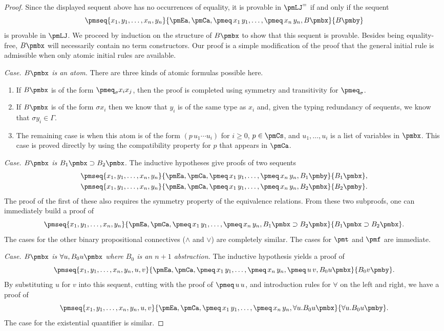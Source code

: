 \begin{proof}
Since the displayed sequent above has no occurrences of equality, it is provable in $\pmLJ^=$ if and only if the sequent
\[\pmseq{x_1,y_1,\ldots,x_n,y_n}{\pmEa,\pmCa,\pmeq\,x_1\,y_1,\ldots,\pmeq\,x_n\,y_n,B\pmbx}{B\pmby}\]
is provable in $\pmLJ$. We proceed by induction on the structure of $B\pmbx$ to show that this sequent is provable. Besides being equality-free, $B\pmbx$ will necessarily contain no term constructors. Our proof is a simple modification of the proof that the general initial rule is admissible when only atomic initial rules are available.\par
\emph{Case. $B\pmbx$ is an atom.} There are three kinds of atomic formulas possible here.
\begin{enumerate}
\item If $B\pmbx$ is of the form $\pmeq_\sigma x_i x_j$, then the proof is completed using symmetry and transitivity for $\pmeq_\sigma$.
\item If $B\pmbx$ is of the form $\sigma x_i$ then we know that $y_i$ is of the same type as $x_i$ and, given the typing redundancy of sequents, we know that $\sigma y_i\in\Gamma$.
\item The remaining case is when this atom is of the form $(p\,u_1\cdots u_i)$ for $i\geq0$, $p\in\pmCs$, and $u_1,\ldots,u_i$ is a list of variables in $\pmbx$. This case is proved directly by using the compatibility property for $p$ that appears in $\pmCa$.
\end{enumerate}
\emph{Case. $B\pmbx$ is $B_1\pmbx\supset B_2\pmbx$.} The inductive hypotheses give proofs of two sequents
\begin{gather*}
\pmseq{x_1,y_1,\ldots,x_n,y_n}{\pmEa,\pmCa,\pmeq\,x_1\,y_1,\ldots,\pmeq\,x_n\,y_n,B_1\pmby}{B_1\pmbx},\\
\pmseq{x_1,y_1,\ldots,x_n,y_n}{\pmEa,\pmCa,\pmeq\,x_1\,y_1,\ldots,\pmeq\,x_n\,y_n,B_2\pmbx}{B_2\pmby}.
\end{gather*}
The proof of the first of these also requires the symmetry property of the equivalence relations. From these two subproofs, one can immediately build a proof of
\[\pmseq{x_1,y_1,\ldots,x_n,y_n}{\pmEa,\pmCa,\pmeq\,x_1\,y_1,\ldots,\pmeq\,x_n\,y_n,B_1\pmbx\supset B_2\pmbx}{B_1\pmbx\supset B_2\pmbx}.\]
The cases for the other binary propositional connectives ($\wedge$ and $\vee$) are completely similar. The cases for $\pmt$ and $\pmf$ are immediate.\par
\emph{Case. $B\pmbx$ is $\forall u,B_0 u\pmbx$ where $B_0$ is an $n+1$ abstraction.} The inductive hypothesis yields a proof of
\[\pmseq{x_1,y_1,\ldots,x_n,y_n,u,v}{\pmEa,\pmCa,\pmeq\,x_1\,y_1,\ldots,\pmeq\,x_n\,y_n,\pmeq\,u\,v,B_0u\pmbx}{B_0v\pmby}.\]
By substituting $u$ for $v$ into this sequent, cutting with the proof of $\pmeq\,u\,u$, and introduction rules for $\forall$ on the left and right, we have a proof of
\[\pmseq{x_1,y_1,\ldots,x_n,y_n,u,v}{\pmEa,\pmCa,\pmeq\,x_1\,y_1,\ldots,\pmeq\,x_n\,y_n,\forall u.B_0u\pmbx}{\forall u.B_0u\pmby}.\]
The case for the existential quantifier is similar.
\end{proof}
